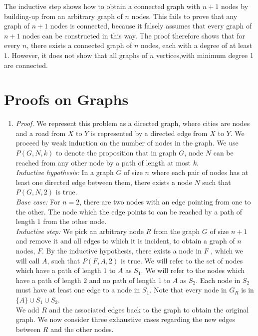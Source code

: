 \documentclass{article}
\begin{document}
The inductive step shows how to obtain a connected graph with $n+1$ nodes by building-up from an arbitrary graph of $n$ nodes. This fails to prove that any graph of $n+1$ nodes is connected, because it falsely assumes that every graph of $n+1$ nodes can be constructed in this way. The proof therefore shows that for every $n$, there exists a connected graph of $n$ nodes, each with a degree of at least $1$. However, it does not show that all graphs of $n$ vertices,with minimum degree 1 are connected.

\section{Proofs on Graphs}
\begin{enumerate}[label=(\alph*)]
    \item \textit{Proof.} We represent this problem as a directed graph, where cities are nodes and a road from $X$ to $Y$ is represented by a directed edge from $X$ to $Y$. We proceed by weak induction on the number of nodes in the graph. We use $P(G, N, k)$ to denote the proposition that in graph $G$, node $N$ can be reached from any other node by a path of length at most $k$.\\
    
    \textit{Inductive hypothesis:} In a graph $G$ of size $n$ where each pair of nodes has at least one directed edge between them, there exists a node $N$ such that $P(G, N, 2)$ is true. \\
    
    \textit{Base case:} For $n=2$, there are two nodes with an edge pointing from one to the other. The node which the edge points to can be reached by a path of length $1$ from the other node. \\
    
    \textit{Inductive step:}
    We pick an arbitrary node $R$ from the graph $G$ of size $n+1$ and remove it and all edges to which it is incident, to obtain a graph of $n$ nodes, $F$. By the inductive hypothesis, there exists a node in $F$ , which we will call $A$, such that $P(F, A, 2)$ is true. We will refer to the set of nodes which have a path of length $1$ to $A$ as $S_1$. We will refer to the nodes which have a path of length $2$ and no path of length $1$ to $A$ as $S_2$. Each node in $S_2$ must have at least one edge to a node in $S_1$. Note that every node in $G_R$ is in $\{A\}\cup S_1 \cup S_2$.\\
    
    We add $R$ and the associated edges back to the graph to obtain the original graph. We now consider three exhaustive cases regarding the new edges between $R$ and the other nodes.\\
    

\end{enumerate}
\end{document}

